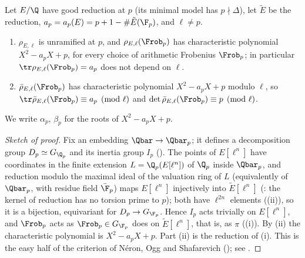 \begin{theorem}\label{thm:ellcurves:frobQ}
Let $E/\Q$ have good reduction at $p$ (its minimal model has $p\nmid\Delta$), let $\tilde E$ be the reduction, $a_p=a_p(E)=p+1-\#\tilde E(\F_p)$, and $\ell\ne p$.
\begin{enumerate}[label=(\roman*)]
\item $\rho_{E,\ell}$ is unramified at $p$, and $\rho_{E,\ell}(\Frob_p)$ has characteristic polynomial $X^2-a_pX+p$, for every choice of arithmetic Frobenius $\Frob_p$; in particular
$\tr\rho_{E,\ell}(\Frob_p)=a_p$ does not depend on $\ell$.
\item $\bar\rho_{E,\ell}(\Frob_p)$ has characteristic polynomial $X^2-a_pX+p$ modulo $\ell$, so $\tr\bar\rho_{E,\ell}(\Frob_p)\equiv a_p\pmod\ell$ and $\det\bar\rho_{E,\ell}(\Frob_p)\equiv p\pmod\ell$.
\end{enumerate}
We write $\alpha_p$, $\beta_p$ for the roots of $X^2-a_pX+p$.
\end{theorem}

\begin{proof}[Sketch of proof]
Fix an embedding $\Qbar\to\Qbar_p$; it defines a decomposition group $D_p\simeq G_{\Q_p}$ and its inertia group $I_p$ (). The points of $E[\ell^n]$ have
coordinates in the finite extension $L=\Q_p(E[\ell^n])$ of $\Q_p$ inside $\Qbar_p$, and reduction modulo the maximal ideal of the valuation ring of $L$ (equivalently of $\Qbar_p$, with
residue field $\bar\F_p$) maps $E[\ell^n]$ injectively into $\tilde E[\ell^n]$ (: the kernel of reduction has no torsion prime to $p$); both have $\ell^{2n}$ elements ((ii)),
so it is a bijection, equivariant for $D_p\to G_{\F_p}$. Hence $I_p$ acts trivially on $E[\ell^n]$, and $\Frob_p$ acts as $\Frob_p\in G_{\F_p}$ does on $\tilde E[\ell^n]$, that is, as $\pi$
((i)). By (ii) the characteristic polynomial is $X^2-a_pX+p$. Part (ii) is the reduction of (i). This is the easy half of the criterion of
N\'eron, Ogg and Shafarevich (); see \cite[Section VII.7]{SilvermanAEC}.
\end{proof}

